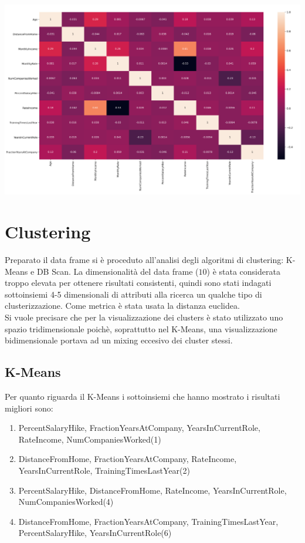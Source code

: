 \documentclass[english]{article}
\begin{document}
\begin{center}
\includegraphics[scale=1.2]{macnum.png}
\end{center}

\section{Clustering}
Preparato il data frame si è proceduto all'analisi degli algoritmi di clustering: K-Means e DB Scan. La dimensionalità del data frame ($10$) è stata considerata troppo elevata per ottenere risultati consistenti, quindi sono stati indagati sottoinsiemi 4-5 dimensionali di attributi alla ricerca un qualche tipo di clusterizzazione. Come metrica è stata usata la distanza euclidea.\\
Si vuole precisare che per la visualizzazione dei clusters è stato utilizzato uno spazio tridimensionale poichè, soprattutto nel K-Means, una visualizzazione bidimensionale portava ad un mixing eccesivo dei cluster stessi.
\subsection{K-Means}
Per quanto riguarda il K-Means i sottoinsiemi che hanno mostrato i risultati migliori sono:\\

\begin{enumerate}
\item PercentSalaryHike, FractionYearsAtCompany, YearsInCurrentRole, RateIncome, NumCompaniesWorked(1)
\item DistanceFromHome, FractionYearsAtCompany, RateIncome, YearsInCurrentRole, TrainingTimesLastYear(2)
\item PercentSalaryHike, DistanceFromHome, RateIncome, YearsInCurrentRole, NumCompaniesWorked(4)
\item DistanceFromHome, FractionYearsAtCompany, TrainingTimesLastYear, PercentSalaryHike, YearsInCurrentRole(6)
\end{enumerate}
\end{document}
